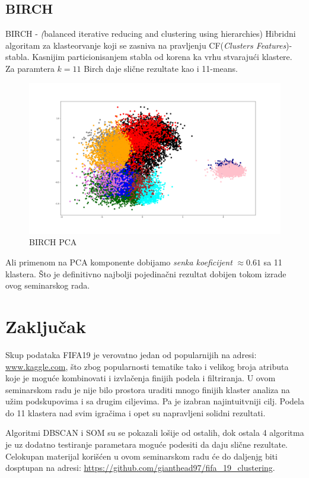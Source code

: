 \documentclass[a4paper, 11pt]{article}
\begin{document}
\subsection{BIRCH}

BIRCH - \emph(balanced iterative reducing and clustering using hierarchies)
Hibridni algoritam za klasteorvanje koji se zasniva na pravljenju
CF(\emph{Clusters Features})-stabla. Kasnijim particionisanjem
stabla od korena ka vrhu stvaraju\'{c}i klastere.
\\
Za paramtera $k = 11$ Birch daje sli\v{c}ne rezultate kao i 11-means.


\begin{figure}[h]
\centering
\graphicspath{{../}}
\includegraphics[scale=0.2]{birch_11_pca.png}
\caption{BIRCH PCA}
\end{figure}

Ali primenom na PCA komponente dobijamo \emph{senka koeficijent} $\approx 0.61$
sa 11 klastera. \v{S}to je definitivno najbolji pojedina\v{c}ni rezultat
dobijen tokom izrade ovog seminarskog rada.


\section{Zaklju\v{c}ak}
Skup podataka FIFA19 je verovatno jedan od popularnijih na
adresi: \url{www.kaggle.com}, \v{s}to zbog popularnosti tematike
tako i velikog broja atributa koje je mogu\'{c}e kombinovati i izvla\v{c}enja
finijih podela i filtriranja. U ovom seminarskom radu je nije bilo prostora uraditi
mnogo finijih klaster analiza na u\v{z}im podskupovima i sa drugim ciljevima.
Pa je izabran najintuitvniji cilj. Podela do 11 klastera nad svim igra\v{c}ima
i opet su napravljeni solidni rezultati.

Algoritmi DBSCAN i SOM su se pokazali lo\v{s}ije od ostalih,
dok ostala 4 algoritma je uz dodatno testiranje parametara
mogu\'{c}e podesiti da daju sli\v{c}ne rezultate. \\

Celokupan materijal kori\v{s}\'{c}en u ovom seminarskom 
radu \'{c}e do daljenjg biti dosptupan na adresi:
\url{https://github.com/gianthead97/fifa_19_clustering}.
\end{document}
